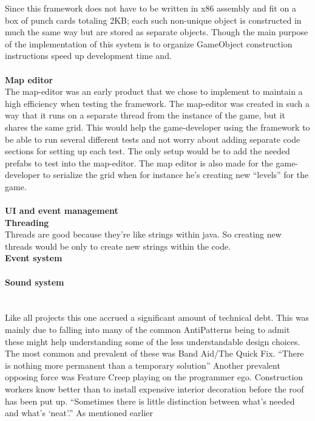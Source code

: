 \documentclass[main.tex]{subfiles}
\begin{document}
Since this framework does not have to be written in x86 assembly and fit on a box of punch cards totaling 2KB; each such non-unique object is constructed in much the same way but are stored as separate objects. Though the main purpose of the implementation of this system is to organize GameObject construction instructions speed up development time and.
\\ \\
\textbf{Map editor} \\%
The map-editor was an early product that we chose to implement to maintain a high efficiency when testing the framework. The map-editor was created in such a way that it runs on a separate thread from the instance of the game, but it shares the same grid. This would help the game-developer using the framework to be able to run several different tests and not worry about adding separate code sections for setting up each test. The only setup would be to add the needed prefabs to test into the map-editor. The map editor is also made for the game-developer to serialize the grid when for instance he’s creating new “levels” for the game.
\\ \\
\textbf{UI and event management} \\%
\textbf{Threading} \\%
Threads are good because they’re like strings within java. So creating new threads would be only to create new strings within the code.
\\
\textbf{Event system} \\%
\\
\textbf{Sound system} \\%
\\ \\
Like all projects this one accrued a significant amount of technical debt. This was mainly due to falling into many of the common AntiPatterns being to admit these might help understanding some of the less understandable design choices. The most common and prevalent of these was Band Aid/The Quick Fix. 
“There is nothing more permanent than a temporary solution”
Another prevalent opposing force was Feature Creep playing on the programmer ego. Construction workers know better than to install expensive interior decoration before the roof has been put up.
“Sometimes there is little distinction between what's needed and what's ‘neat’.”
As mentioned earlier 
\\ \\
\end{document}
